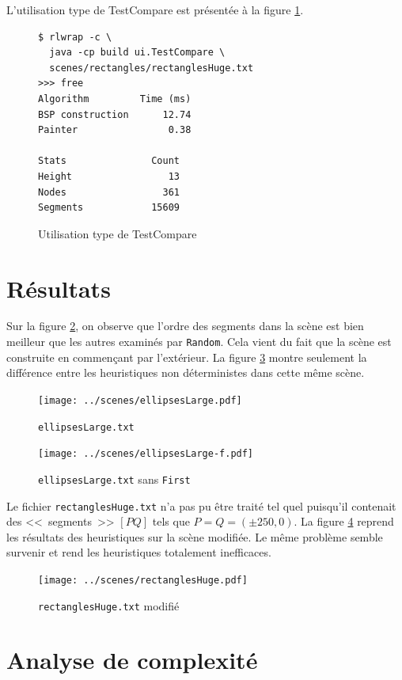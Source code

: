 \documentclass[12pt,twocolumn]{article}
\begin{document}
L'utilisation type de TestCompare est présentée à la figure \ref{fig:cmp}.

\begin{figure}[h]
\begin{verbatim}
$ rlwrap -c \
  java -cp build ui.TestCompare \
  scenes/rectangles/rectanglesHuge.txt
>>> free
Algorithm         Time (ms)
BSP construction      12.74
Painter                0.38

Stats               Count
Height                 13
Nodes                 361
Segments            15609
\end{verbatim}
\caption{Utilisation type de TestCompare}\label{fig:cmp}
\end{figure}


\section{Résultats}
Sur la figure \ref{fig:eL}, on observe que l'ordre des segments dans la
scène est bien meilleur que les autres examinés par \texttt{Random}. Cela vient
du fait que la scène est construite en commençant par l'extérieur.
La figure \ref{fig:eL-n} montre seulement la différence entre
les heuristiques non déterministes dans cette même scène.
\begin{figure}[p]
\center
\texttt{[image: ../scenes/ellipsesLarge.pdf]}
\caption{\texttt{ellipsesLarge.txt}}\label{fig:eL}
\end{figure}
\begin{figure}[p]
\center
\texttt{[image: ../scenes/ellipsesLarge-f.pdf]}
\caption{\texttt{ellipsesLarge.txt} sans \texttt{First}}\label{fig:eL-n}
\end{figure}

Le fichier \texttt{rectanglesHuge.txt} n'a pas pu être traité tel quel puisqu'il
contenait des <<~segments~>> $[PQ]$ tels que $P=Q=(\pm250,0)$.
La figure \ref{fig:eR} reprend les résultats des heuristiques
sur la scène modifiée.
Le même problème semble survenir et rend les heuristiques totalement inefficaces.

\begin{figure}[p]
\center
\texttt{[image: ../scenes/rectanglesHuge.pdf]}
\caption{\texttt{rectanglesHuge.txt} modifié}\label{fig:eR}
\end{figure}


\section{Analyse de complexité}
\end{document}
